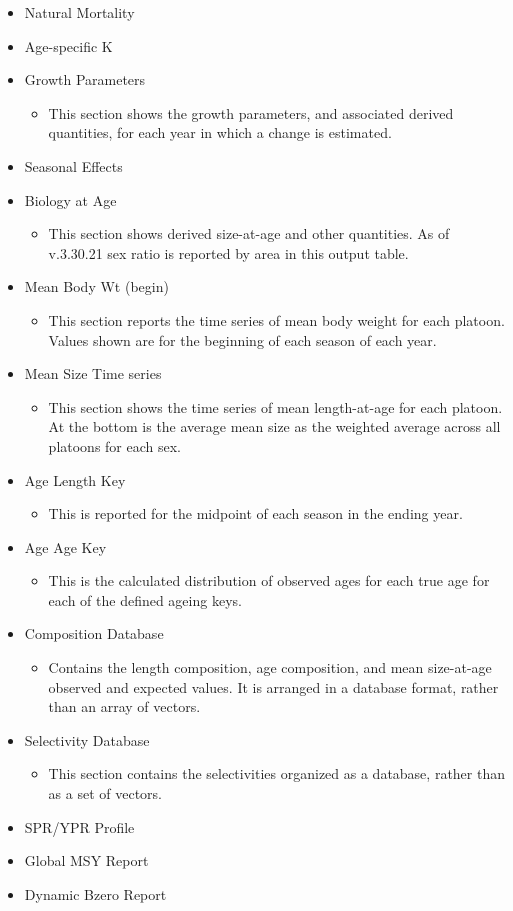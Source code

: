 \begin{itemize}
\begin{itemize}
	\end{itemize}
	\item Natural Mortality
	\item Age-specific K
	\item Growth Parameters
	\begin{itemize}
		\item This section shows the growth parameters, and associated derived quantities, for each year in which a change is estimated.
	\end{itemize}
	\item Seasonal Effects
	\item Biology at Age
	\begin{itemize}
		\item This section shows derived size-at-age and other quantities. As of v.3.30.21 sex ratio is reported by area in this output table.
	\end{itemize}
	\item Mean Body Wt (begin)
	\begin{itemize}
		\item This section reports the time series of mean body weight for each platoon. Values shown are for the beginning of each season of each year.
	\end{itemize}
	\item Mean Size Time series
	\begin{itemize}
		\item This section shows the time series of mean length-at-age for each platoon. At the bottom is the average mean size as the weighted average across all platoons for each sex.
	\end{itemize}
	\item Age Length Key
	\begin{itemize}
		\item This is reported for the midpoint of each season in the ending year.
	\end{itemize}
	\item Age Age Key
	\begin{itemize}
		\item This is the calculated distribution of observed ages for each true age for each of the defined ageing keys.
	\end{itemize}
	\item Composition Database
	\begin{itemize}
		\item Contains the length composition, age composition, and mean size-at-age observed and expected values. It is arranged in a database format, rather than an array of vectors.
	\end{itemize}
	\item Selectivity Database
	\begin{itemize}
		\item This section contains the selectivities organized as a database, rather than as a set of vectors.
	\end{itemize}
	\item SPR/YPR Profile
	\item Global MSY Report
	\item Dynamic Bzero Report
\end{itemize}

\pagebreak
